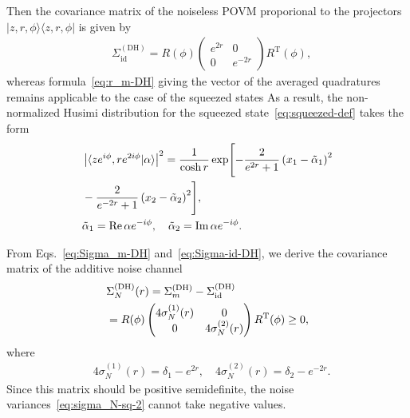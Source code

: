 \documentclass[%
reprint,
superscriptaddress,
 amsmath,amssymb,amsfonts,
 aps,
 pra,
 longbibliography
]{revtex4-2}
\newcommand{\ket}[1]{\ensuremath{|{#1}\rangle}}
\newcommand{\bra}[1]{\ensuremath{\langle{#1}|}}
\newcommand{\avr}[1]{\ensuremath{\langle{#1}\rangle}}
\newcommand{\tcnj}[1]{{#1}^{\mathrm{T}}}
\renewcommand{\Re}{\mathop{\rm Re}\nolimits}
\renewcommand{\Im}{\mathop{\rm Im}\nolimits}
\newcommand{\ind}[1]{\mathrm{#1}}
\begin{document}
Then the covariance matrix of the noiseless POVM
proporional to the projectors
$\ket{z,r,\phi}\bra{z,r,\phi}$ is given by
\begin{align}
  \label{eq:Sigma-id-DH}
  &
  \Sigma_{\ind{id}}^{(\ind{DH})}=
    R(\phi)
    \begin{pmatrix}
      e^{2r}&0\\0&e^{-2r}
    \end{pmatrix}
    \tcnj{R}(\phi),
\end{align}
whereas formula~\eqref{eq:r_m-DH} giving
the vector of the averaged quadratures
remains applicable to the case of the squeezed states
As a result,
the non-normalized Husimi distribution
for the squeezed state~\eqref{eq:squeezed-def} takes
the form
\begin{align}
  \label{eq:squeezed-Q}
  &
    \left|\avr{z e^{i\phi},r e^{2 i \phi}|\alpha}\right|^2=\frac{1}{\cosh r}
    \exp\Biggl[-
    \frac{2}{e^{2 r}+1}
    \left(x_1-\tilde{\alpha}_1\right)^2
    \notag
  \\
  &
    -\frac{2}{e^{-2 r}+1}\left(x_2-\tilde{\alpha}_2\right)^2
      \Biggr],
  \\
  \label{eq:tbeta-alpha}
  &
  \tilde{\alpha}_1=\Re \alpha e^{-i\phi},
  \quad
  \tilde{\alpha}_2=\Im \alpha e^{-i\phi}.
\end{align}

From Eqs.~\eqref{eq:Sigma_m-DH} and~\eqref{eq:Sigma-id-DH},
we derive the covariance matrix of the additive noise channel
\begin{align}
  &
    \label{eq:Sigma-N-DH}
    \Sigma_{N}^{(\ind{DH})}(r)=
    \Sigma_{m}^{(\ind{DH})}-\Sigma_{\ind{id}}^{(\ind{DH})}
    \notag
  \\
  &
    = R(\phi)
\begin{pmatrix}
      4\sigma_N^{(1)}(r) &0\\0& 4 \sigma_N^{(2)}(r)
    \end{pmatrix}
    \tcnj{R}(\phi)\ge 0,
\end{align}
where
\begin{align}
  \label{eq:sigma_N-sq-2}
  &
    4\sigma_N^{(1)}(r)=\delta_1-e^{2r},
    \quad
    4\sigma_N^{(2)}(r)=\delta_2-e^{-2r}.
\end{align}
Since this matrix should be positive semidefinite,
the noise variances~\eqref{eq:sigma_N-sq-2}
cannot take negative values.
\end{document}
